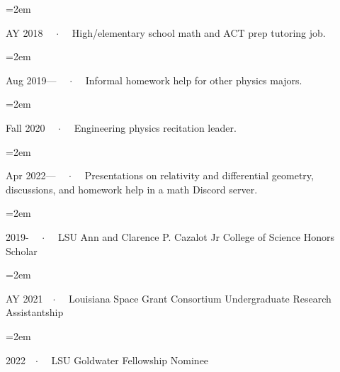 \documentclass{scrartcl}
\newcommand{\Description}[1]{\hangindent=2em\hangafter=0\noindent\raggedright\footnotesize{#1}\par\normalsize\vspace{1em}} %
\begin{document}
\begin{cv}{}
  \vspace{1em}

  \Description{AY 2018 \ \ $\cdotp$ \ \ High/elementary school math and ACT prep tutoring job.}
  \Description{Aug 2019--- \ \ $\cdotp$ \ \ Informal homework help for other physics majors.}
  \Description{Fall 2020 \ \ $\cdotp$ \ \ Engineering physics recitation leader.}
  \Description{Apr 2022--- \ \ $\cdotp$ \ \ Presentations on relativity and differential geometry, discussions, and homework help in a math
  Discord server.}

  \vspace{1em}

  \Description{2019- \ \ $\cdotp$ \ \ LSU Ann and Clarence P. Cazalot Jr College of Science Honors Scholar}

  \vspace{-0.5em}

  \Description{AY 2021\ \ $\cdotp$ \ \ Louisiana Space Grant Consortium Undergraduate Research Assistantship}

  \vspace{-0.5em} %

  \Description{2022\ \ $\cdotp$ \ \ LSU Goldwater Fellowship Nominee}



\end{cv}
\end{document}
